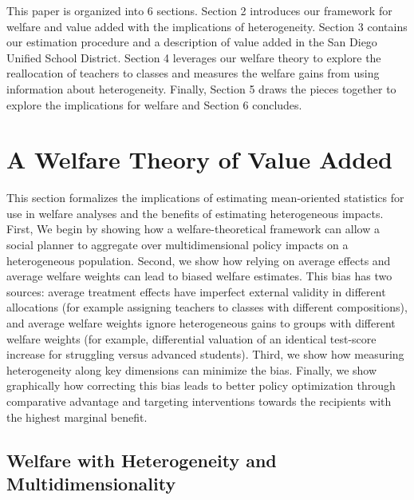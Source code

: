 \documentclass[12pt]{article}
\theoremstyle{definition}
\theoremstyle{definition}
\theoremstyle{definition}
\theoremstyle{definition}
\begin{document}


This paper is organized into 6 sections. Section 2 introduces our framework for welfare and value added with the implications of heterogeneity. Section 3 contains our estimation procedure and a description of value added in the San Diego Unified School District. Section 4 leverages our welfare theory to explore the reallocation of teachers to classes and measures the welfare gains from using information about heterogeneity. Finally, Section 5 draws the pieces together to explore the implications for welfare and Section 6 concludes.

\section{A Welfare Theory of Value Added}
\label{theory_section}
This section formalizes the implications of estimating mean-oriented statistics for use in welfare analyses and the benefits of estimating heterogeneous impacts. First, We begin by showing how a welfare-theoretical framework can allow a social planner to aggregate over multidimensional policy impacts on a heterogeneous population. Second, we show how relying on average effects and average welfare weights can lead to biased welfare estimates. This bias has two sources: average treatment effects have imperfect external validity in different allocations (for example assigning teachers to classes with different compositions), and average welfare weights ignore heterogeneous gains to groups with different welfare weights (for example, differential valuation of an identical test-score increase for struggling versus advanced students). Third, we show how measuring heterogeneity along key dimensions can minimize the bias. Finally, we show graphically how correcting this bias leads to better policy optimization through comparative advantage and targeting interventions towards the recipients with the highest marginal benefit.

\subsection{Welfare with Heterogeneity and Multidimensionality}
\end{document}
